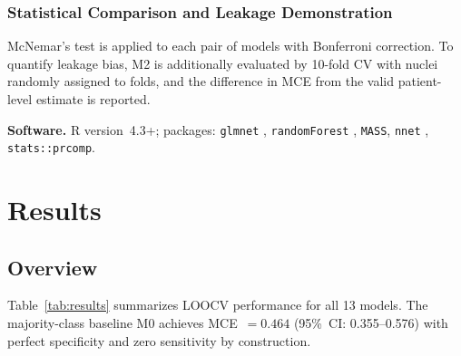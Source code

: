 \documentclass[12pt, onecolumn]{article}
\begin{document}
\subsubsection{Statistical Comparison and Leakage Demonstration}

McNemar's test is applied to each pair of models with Bonferroni
correction. To quantify leakage bias, M2 is additionally evaluated
by 10-fold CV with nuclei randomly assigned to folds, and the
difference in MCE from the valid patient-level estimate is
reported.

\textbf{Software.} R version~4.3+; packages: \texttt{glmnet}
\citep{friedman2010}, \texttt{randomForest} \citep{liaw2002},
\texttt{MASS}, \texttt{nnet} \citep{venables2002},
\texttt{stats::prcomp}.

\section{Results}

\subsection{Overview}

Table~\ref{tab:results} summarizes LOOCV performance for all 13 models. The majority-class baseline M0 achieves MCE~$= 0.464$ (95\%~CI: 0.355--0.576) with perfect specificity and zero sensitivity by construction.
\end{document}
